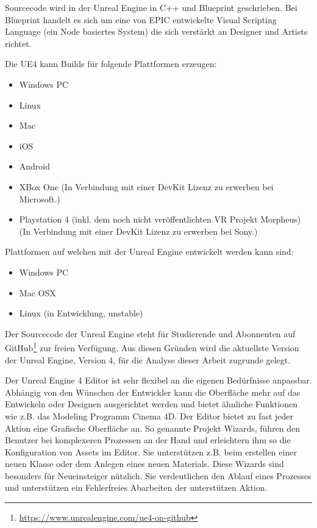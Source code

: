 \documentclass[pagesize, paper=a4, fontsize=12pt, titlepage=true, headings=small, headnosepline, abstractoff, liststotoc, nochapterprefix, plainheadsepline, twoside]{scrreprt}
\begin{document}
Sourcecode wird in der Unreal Engine in C++ und Blueprint geschrieben. Bei Blueprint handelt es sich um eine von EPIC entwickelte Visual Scripting Language (ein Node basiertes System) die sich verstärkt an Designer und Artists richtet.

Die UE4 kann Builds für folgende Plattformen erzeugen:
\begin{itemize}
\item Windows PC
\item Linux
\item Mac
\item iOS
\item Android
\item XBox One (In Verbindung mit einer DevKit Lizenz zu erwerben bei Microsoft.)
\item Playstation 4 (inkl. dem noch nicht veröffentlichten VR Projekt Morpheus) (In Verbindung mit einer DevKit Lizenz zu erwerben bei Sony.)
\end{itemize}

Plattformen auf welchen mit der Unreal Engine entwickelt werden kann sind:
\begin{itemize}
\item Windows PC
\item Mac OSX
\item Linux (in Entwicklung, unstable)
\end{itemize}

Der Sourcecode der Unreal Engine steht für Studierende und Abonnenten auf GitHub\footnote{\url{https://www.unrealengine.com/ue4-on-github}} zur freien Verfügung. Aus diesen Gründen wird die aktuellste Version der Unreal Engine, Version 4, für die Analyse dieser Arbeit zugrunde gelegt.

Der Unreal Engine 4 Editor ist sehr flexibel an die eigenen Bedürfnisse anpassbar. Abhängig von den Wünschen der Entwickler kann die Oberfläche mehr auf das Entwickeln oder Designen ausgerichtet werden und bietet ähnliche Funktionen wie z.B. das Modeling Programm Cinema 4D. Der Editor bietet zu fast jeder Aktion eine Grafische Oberfläche an. So genannte Projekt Wizards, führen den Benutzer bei komplexeren Prozessen an der Hand und erleichtern ihm so die Konfiguration von Assets im Editor. Sie unterstützen z.B. beim erstellen einer neuen Klasse oder dem Anlegen eines neuen Materials. Diese Wizards sind besonders für Neueinsteiger nützlich. Sie verdeutlichen den Ablauf eines Prozesses und unterstützen ein Fehlerfreies Abarbeiten der unterstützen Aktion.
\end{document}
